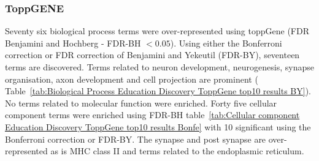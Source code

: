            
            
            \subsubsection{ToppGENE}

     
           
            
            Seventy six biological process terms were over-represented using toppGene (FDR Benjamini and Hochberg - FDR-BH $<0.05$). Using either the Bonferroni correction or FDR correction of Benjamini and Yekeutil (FDR-BY), seventeen terms are discovered.  Terms related to neuron development, neurogenesis, synapse organisation, axon development and cell projection are prominent ( Table~\ref{tab:Biological Process Education Discovery ToppGene top10 results BY}). No terms related to molecular function were enriched. 
             Forty five cellular component terms were enriched using FDR-BH table~\ref{tab:Cellular component Education Discovery ToppGene top10 results Bonfe} with 10 significant using the Bonferroni correction or FDR-BY. The synapse and post synapse are over-represented as is MHC class II and terms related to the endoplasmic reticulum.
            
